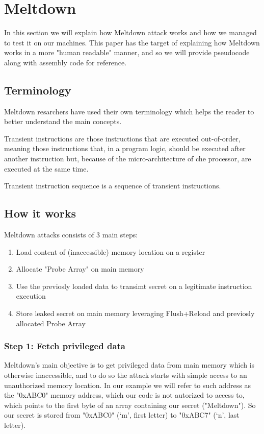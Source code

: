 \section{Meltdown}
In this section we will explain how Meltdown attack works and how we managed to
test it on our machines. This paper has the target of explaining how Meltdown works in a more "human readable" manner, and so we will provide pseudocode along with
assembly code for reference.

\subsection{Terminology}
Meltdown resarchers have used their own terminology which helps the reader to better understand the main concepts.

Transient instructions are those instructions that are executed out-of-order, meaning those instructions that, in a program logic, should be executed
after another instruction but, because of the micro-architecture of che processor, are executed at the same time.

Transient instruction sequence is a sequence of transient instructions.

\subsection{How it works}
Meltdown attacks consists of 3 main steps:

\begin{enumerate}[label={Step \arabic*:}]
    \item Load content of (inaccessible) memory location on a register
    \item Allocate "Probe Array" on main memory
    \item Use the previosly loaded data to transimt secret on a legitimate instruction execution
    \item Store leaked secret on main memory leveraging Flush+Reload and previosly allocated Probe Array
\end{enumerate}


\subsubsection{Step 1: Fetch privileged data}
Meltdown's main objective is to get privileged data from main memory which is otherwise inaccessible, and to do so
the attack starts with simple access to an unauthorized memory location.
In our example we will refer to such address as the "0xABC0" memory address, which our code is not autorized to access to,
which points to the first byte of an array containing our secret ("Meltdown").
So our secret is stored from "0xABC0" (`m', first letter) to "0xABC7" (`n', last letter).

